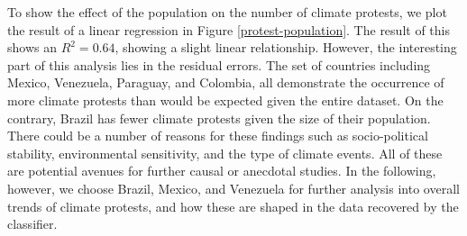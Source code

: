 To show the effect of the population on the number of climate protests, we plot the result of a linear regression in Figure \ref{protest-population}.
The result of this shows an $R^2 = 0.64$, showing a slight linear relationship.
However, the interesting part of this analysis lies in the residual errors.
The set of countries including Mexico, Venezuela, Paraguay, and Colombia, all demonstrate the occurrence of more climate protests than would be expected given the entire dataset.
On the contrary, Brazil has fewer climate protests given the size of their population.
There could be a number of reasons for these findings such as socio-political stability, environmental sensitivity, and the type of climate events.
All of these are potential avenues for further causal or anecdotal studies.
In the following, however, we choose Brazil, Mexico, and Venezuela for further analysis into overall trends of climate protests, and how these are shaped in the data recovered by the classifier.


%
%


